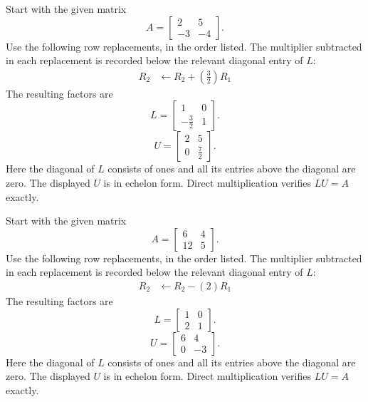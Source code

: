 Start with the given matrix
\[A=\left[\begin{matrix}2 & 5\\-3 & -4\end{matrix}\right].\]
Use the following row replacements, in the order listed. The multiplier
subtracted in each replacement is recorded below the relevant diagonal
entry of $L$:
\begin{align*}R_{2}&\leftarrow R_{2}+(\frac{3}{2})R_{1}\end{align*}The resulting factors are
\[L=\left[\begin{matrix}1 & 0\\- \frac{3}{2} & 1\end{matrix}\right].\]
\[U=\left[\begin{matrix}2 & 5\\0 & \frac{7}{2}\end{matrix}\right].\]Here the diagonal of $L$ consists of ones and all its entries above
the diagonal are zero. The displayed $U$ is in echelon form.
Direct multiplication verifies $LU=A$ exactly.

Start with the given matrix
\[A=\left[\begin{matrix}6 & 4\\12 & 5\end{matrix}\right].\]
Use the following row replacements, in the order listed. The multiplier
subtracted in each replacement is recorded below the relevant diagonal
entry of $L$:
\begin{align*}R_{2}&\leftarrow R_{2}-(2)R_{1}\end{align*}The resulting factors are
\[L=\left[\begin{matrix}1 & 0\\2 & 1\end{matrix}\right].\]
\[U=\left[\begin{matrix}6 & 4\\0 & -3\end{matrix}\right].\]Here the diagonal of $L$ consists of ones and all its entries above
the diagonal are zero. The displayed $U$ is in echelon form.
Direct multiplication verifies $LU=A$ exactly.

